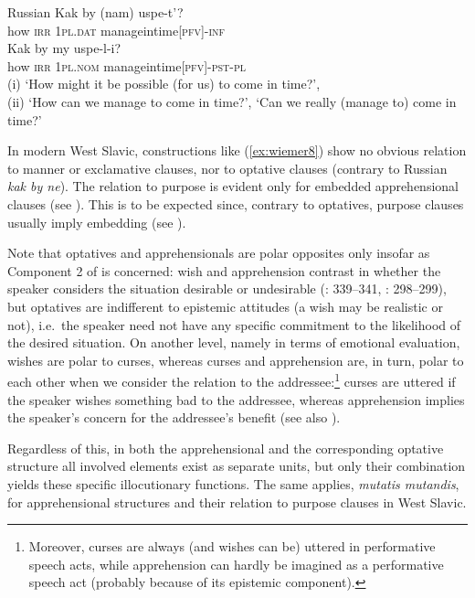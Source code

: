 \documentclass[output=paper,colorlinks,citecolor=brown]{langscibook}
\begin{document}
\ea \textnormal{Russian}
\label{ex:wiemer10} 
\ea \label{ex:wiemer10a}
\gll Kak by (nam) uspe-t'? \\
how \textsc{irr} \textsc{1pl.dat} manage\textunderscore in\textunderscore time\textsc{[pfv]-inf} \\
\ex \label{ex:wiemer10b}
\gll Kak by my uspe-l-i? \\
how \textsc{irr} \textsc{1pl.nom} manage\textunderscore in\textunderscore time\textsc{[pfv]-pst-pl}\\
\glt (i) `How might it be possible (for us) to come in time?', \\
(ii) `How can we manage to come in time?', `Can we really (manage to) come in time?'
\z
\z


 In modern West Slavic, constructions like (\ref{ex:wiemer8}) show no obvious relation to manner or exclamative clauses, nor to optative clauses (contrary to Russian \textit{kak by ne}). The relation to purpose is evident only for embedded apprehensional clauses (see ). This is to be expected since, contrary to optatives, purpose clauses usually imply embedding (see ).

Note that optatives and apprehensionals are polar opposites only insofar as Component 2 of  is concerned: wish and apprehension contrast in whether the speaker considers the situation desirable or undesirable (\citealt{Dobrushina2016}: 339--341, \citealt{Wiemer2017}: 298--299), but optatives are indifferent to epistemic attitudes (a wish may be realistic or not), i.e.\ the speaker need not have any specific commitment to the likelihood of the desired situation. On another level, namely in terms of emotional evaluation, wishes are polar to curses, whereas curses and apprehension are, in turn, polar to each other when we consider the relation to the addressee:\footnote{Moreover, curses are always (and wishes can be) uttered in performative speech acts, while apprehension can hardly be imagined as a performative speech act (probably because of its epistemic component).} curses are uttered if the speaker wishes something bad to the addressee, whereas apprehension implies the speaker's concern for the addressee's benefit (see also ).


Regardless of this, in both the apprehensional and the corresponding optative structure all involved elements exist as separate units, but only their combination yields these specific illocutionary functions. The same applies, \textit{mutatis mutandis}, for apprehensional structures and their relation to purpose clauses in West Slavic.
\end{document}
